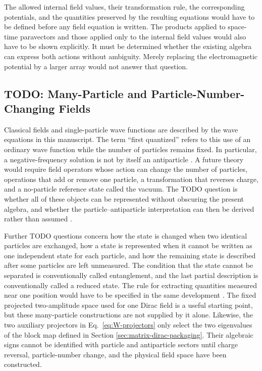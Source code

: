 The allowed internal field values, their transformation rule, the
corresponding potentials, and the quantities preserved by the resulting
equations would have to be defined before any field equation is written.
The products applied to space-time paravectors and those applied only to the
internal field values would also have to be shown explicitly. It must be
determined whether the existing algebra can express both actions without
ambiguity. Merely replacing the electromagnetic potential by a larger array
would not answer that question.

\subsection{TODO: Many-Particle and Particle-Number-Changing Fields}
Classical fields and single-particle wave functions are described by the wave
equations in this manuscript. The term ``first quantized'' refers to this use
of an ordinary wave function while the number of particles remains fixed. In
particular, a negative-frequency solution is not by itself an antiparticle
\cite{greiner2000}. A future theory would require field operators whose
action can change the number of particles, operations that add or remove one
particle, a transformation that reverses charge, and a no-particle reference
state called the vacuum. The TODO question is whether all of these objects
can be represented without obscuring the present algebra, and whether the
particle--antiparticle interpretation can then be derived rather than
assumed \cite{peskin1995}.

Further TODO questions concern how the state is changed when two identical
particles are exchanged, how a state is represented when it cannot be
written as one independent state for each particle, and how the remaining
state is described after some particles are left unmeasured. The condition
that the state cannot be separated is conventionally called entanglement,
and the last partial
description is conventionally called a reduced state. The rule for extracting
quantities measured near one position would have to be specified in the same
development \cite{peskin1995}.
The fixed projected two-amplitude space used for one Dirac field is a useful
starting point, but these many-particle constructions are not supplied by it
alone.
Likewise, the two auxiliary projectors in
Eq.\ \eqref{eq:W-projectors} only select the two eigenvalues of the block map
defined in Section \ref{sec:matrix-dirac-packaging}. Their algebraic signs cannot be
identified with particle and antiparticle sectors until charge reversal,
particle-number change, and the physical field space have been constructed.

